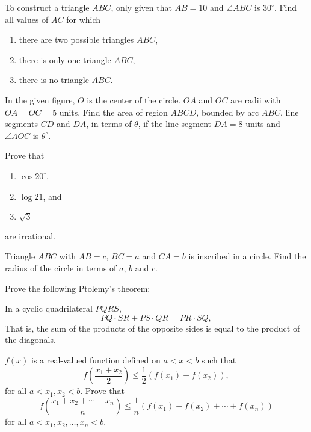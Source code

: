 \begin{problems}
    \problem To construct a triangle $ABC$, only given that $AB = 10$ and
    $\angle ABC$ is $30^\circ$. Find all values of $AC$ for which 
    \begin{enumerate}
        \item there are two possible triangles $ABC$, 
        
        \item there is only one triangle $ABC$, 
        
        \item there is no triangle $ABC$. 
    \end{enumerate}
    
    \problem In the given figure, $O$ is the center of the circle. $OA$ and
    $OC$ are radii with $OA = OC = 5$ units. Find the area of region $ABCD$,
    bounded by arc $ABC$, line segments $CD$ and $DA$, in terms of $\theta$, if
    the line segment $DA = 8$ units and $\angle AOC$ is $\theta^\circ$. 
    
    \problem Prove that
    \begin{enumerate}
        \item $\cos 20^\circ$,
        
        \item $\log 21$, and 
        
        \item $\sqrt{3}$ 
    \end{enumerate}
    are irrational.
    
    \problem Triangle $ABC$ with $AB = c$, $BC = a$ and $CA = b$ is inscribed
    in a circle. Find the radius of the circle in terms of $a$, $b$ and $c$. 
    
    \problem Prove the following Ptolemy's theorem: \par In a cyclic
    quadrilateral $PQRS$, $$PQ \cdot SR + PS \cdot QR = PR \cdot SQ,$$ That is,
    the sum of the products of the opposite sides is equal to the product of
    the diagonals. 
    
    \problem $f(x)$ is a real-valued function defined on $a < x < b$ such that 
    \[f \left( \frac{x_{1} + x_{2}}{2} \right) \leq \frac{1}{2}(f(x_{1}) +
    f(x_{2})),\] 
    for all $a < x_{1}, x_{2} < b$. Prove that 
    \[f\left(\frac{x_{1} + x_{2} + \cdots + x_{n}}{n}\right)\leq
    \frac{1}{n}(f(x_{1}) + f(x_{2}) + \cdots + f(x_{n}))\] 
    for all $a < x_{1}, x_{2}, \ldots, x_{n} < b$. 
    

\end{problems}
